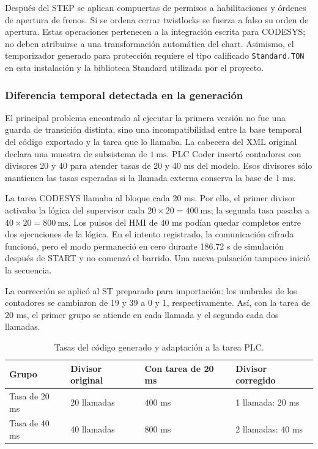 \documentclass[a4paper,10pt,onecolumn,journal]{ieeeconf}
\numberwithin{equation}{section}
\begin{document}
Después del STEP se aplican compuertas de permisos a habilitaciones y órdenes de apertura de frenos. Si se ordena cerrar twistlocks se fuerza a falso su orden de apertura. Estas operaciones pertenecen a la integración escrita para CODESYS; no deben atribuirse a una transformación automática del chart. Asimismo, el temporizador generado para protección requiere el tipo calificado \texttt{Standard.TON} en esta instalación y la biblioteca Standard utilizada por el proyecto.


\subsubsection{Diferencia temporal detectada en la generación}
El principal problema encontrado al ejecutar la primera versión no fue una guarda de transición distinta, sino una incompatibilidad entre la base temporal del código exportado y la tarea que lo llamaba. La cabecera del XML original declara una muestra de subsistema de $1~\mathrm{ms}$. PLC Coder insertó contadores con divisores 20 y 40 para atender tasas de 20 y 40 ms del modelo. Esos divisores sólo mantienen las tasas esperadas si la llamada externa conserva la base de 1 ms.

La tarea CODESYS llamaba al bloque cada 20 ms. Por ello, el primer divisor activaba la lógica del supervisor cada $20\times20=400~\mathrm{ms}$; la segunda tasa pasaba a $40\times20=800~\mathrm{ms}$. Los pulsos del HMI de 40 ms podían quedar completos entre dos ejecuciones de la lógica. En el intento registrado, la comunicación cifrada funcionó, pero el modo permaneció en cero durante 186.72 s de simulación después de START y no comenzó el barrido. Una nueva pulsación tampoco inició la secuencia.

La corrección se aplicó al ST preparado para importación: los umbrales de los contadores se cambiaron de 19 y 39 a 0 y 1, respectivamente. Así, con la tarea de 20 ms, el primer grupo se atiende en cada llamada y el segundo cada dos llamadas.

\begin{table}[!htb]
\centering\small
\caption{Tasas del código generado y adaptación a la tarea PLC.}\label{tab:tasas_plc_coder}
\begin{tabular}{L{4.3cm} C{3.1cm} C{3.1cm} C{3.1cm}}
\toprule
Grupo & Divisor original & Con tarea de 20 ms & Divisor corregido\\
\midrule
Tasa de 20 ms & 20 llamadas & 400 ms & 1 llamada: 20 ms\\
Tasa de 40 ms & 40 llamadas & 800 ms & 2 llamadas: 40 ms\\
\bottomrule
\end{tabular}
\end{table}
\end{document}
